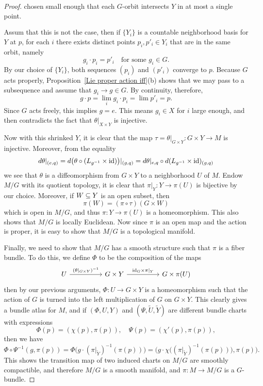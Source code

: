 \begin{proof}
chosen small enough that each $G$-orbit intersects $Y$ in at most a single point.\par
Assum that this is not the case, then if $\{Y_i\}$ is a countable neighborhood basis for $Y$ at 
$p$, for each $i$ there exists distinct points $p_i,p'_i\in Y_i$ that are in the same orbit, 
namely 
\[g_i\cdot p_i=p'_i\quad\text{for some $g_i\in G$}.\]
By our choice of $\{Y_i\}$, both sequences $(p_i)$ and $(p'_i)$ converge to $p$. Because $G$ 
acts properly, Proposition~\ref{Lie proper action iff}(b) shows that we may pass to a 
subsequence and assume that $g_i\to g\in G$. By continuity, therefore,
\[g\cdot p=\lim_i g_i\cdot p_i=\lim p'_i=p.\]
Since $G$ acts freely, this implies $g=e$. This means $g_i\in X$ for $i$ large enough, and then contradicts the fact that $\theta|_{X\times Y}$ is injective.\par
Now with this shrinked $Y$, it is clear that the map $\tau=\theta|_{G\times Y}:G\times Y\to M$ 
is injective. Moreover, from the equality
\[d\theta|_{(e,q)}=d\big(\theta\circ(L_{g^{-1}}\times\mathrm{id})\big)|_{(g,q)}=d\theta|_{e,q}\circ d(L_{g^{-1}}\times\mathrm{id})_{(g,q)}\] 
we see that $\theta$ is a diffeomorphism from $G\times Y$ to a neighborhood $U$ of $M$. Endow $M/G$  with its quotient topology, it is clear that $\pi|_Y:Y\to\pi(U)$ is bijective by our choice. Moreover, if $W\subseteq Y$ is an open subset, then
\[\pi(W)=(\pi\circ\tau)(G\times W)\]
which is open in $M/G$, and thus $\pi:Y\to\pi(U)$ is a homeomorphism. This also shows that $M/G$ is locally Euclidean. Now since $\pi$ is an open map and the action is proper, it is easy to show that $M/G$ is a topological manifold.\par
Finally, we need to show that $M/G$ has a smooth structure such that $\pi$ is a fiber bundle. To do this, we define $\varPhi$ to be the composition of the maps
\[\begin{tikzcd}
U\ar[rr,"(\theta|_{G\times Y})^{-1}"]&&G\times Y\ar[rr,"\id_G\times\pi|_Y"]&&G\times\pi(U)
\end{tikzcd}\]
then by our previous arguments, $\varPhi:U\to G\times Y$ is a homeomorphism such that the action of $G$ is turned into the left multiplication of $G$ on $G\times Y$. This clearly gives a bundle atlas for $M$, and if $(\varPhi,U,Y)$ and $(\varPsi,\widetilde{U},\widetilde{Y})$ are different bundle charts with expressions
\[\varPhi(p)=(\chi(p),\pi(p)),\quad \varPsi(p)=(\chi'(p),\pi(p)),\]
then we have
\[\varPhi\circ\varPsi^{-1}(g,\pi(p))=\varPhi\big(g\cdot(\pi|_{\widetilde{Y}})^{-1}(\pi(p))\big)=\big(g\cdot\chi\big((\pi|_{\widetilde{Y}})^{-1}(\pi(p))\big),\pi(p)\big).\]
This shows the transition map of two induced charts on $M/G$ are smoothly compactible, and therefore $M/G$ is a smooth manifold, and $\pi:M\to M/G$ is a $G$-bundle.
\end{proof}
